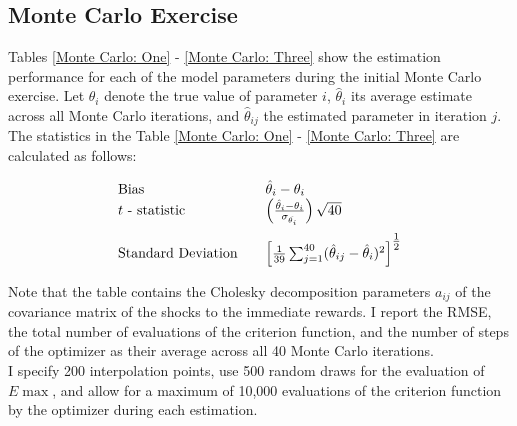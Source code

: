 \subsection{Monte Carlo Exercise}
Tables \ref{Monte Carlo: One} - \ref{Monte Carlo: Three} show the estimation performance for each of the model parameters during the initial Monte Carlo exercise. Let $\theta_i$ denote the true value of parameter $i$, $\hat{\theta}_i$ its average estimate across all Monte Carlo iterations, and $\hat{\theta}_{ij}$ the estimated parameter in iteration $j$. The statistics in the Table \ref{Monte Carlo: One} - \ref{Monte Carlo: Three} are calculated as follows:

\renewcommand\arraystretch{2}
\begin{align*}\begin{array}{l@{\qquad}l}
\text{Bias} & \hat{\theta}_i - \theta_i\\\medskip
\text{$t$ - statistic} & \left(\frac{\hat{\theta}_i - \theta_i}{\sigma_{\hat{\theta_i}}}\right) \sqrt{40} \\
\text{Standard Deviation} & \left[ \frac{1}{39} \sum^{40}_{j = 1} (\hat{\theta}_{ij} - \hat{\theta}_i)^2
\right]^{\tfrac{1}{2}}
\end{array}
\end{align*}
\renewcommand\arraystretch{1}

Note that the table contains the Cholesky decomposition parameters $a_{ij}$ of the covariance matrix of the shocks to the immediate rewards. I report the RMSE, the total number of evaluations of the criterion function, and the number of steps of the optimizer as their average across all 40 Monte Carlo iterations.\\\newline
%
I specify 200 interpolation points, use 500 random draws for the evaluation of $E\max$, and allow for a maximum of 10,000 evaluations of the criterion function by the optimizer during each estimation.\clearpage



\clearpage
